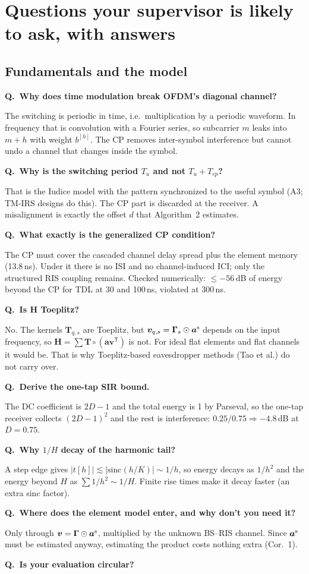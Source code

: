 \documentclass[11pt,a4paper]{article}
\newcounter{qn}
\newcommand{\Q}[1]{\stepcounter{qn}\par\medskip\noindent\textbf{Q\theqn.\ #1}\par\nopagebreak\noindent}
\newcommand{\T}{\mathsf T}
\begin{document}
\section{Questions your supervisor is likely to ask, with answers}

\subsection{Fundamentals and the model}
\Q{Why does time modulation break OFDM's diagonal channel?}
The switching is periodic in time, i.e.\ multiplication by a periodic waveform. In frequency that is convolution with a
Fourier series, so subcarrier $m$ leaks into $m+h$ with weight $b^{[h]}$. The CP removes inter-symbol interference but
cannot undo a channel that changes inside the symbol.
\Q{Why is the switching period $T_u$ and not $T_u+T_{cp}$?}
That is the Iudice model with the pattern synchronized to the useful symbol (A3; TM-IRS designs do this). The CP part is
discarded at the receiver. A misalignment is exactly the offset $d$ that Algorithm~2 estimates.
\Q{What exactly is the generalized CP condition?}
The CP must cover the cascaded channel delay spread plus the element memory (13.8\,ns). Under it there is no ISI and no
channel-induced ICI; only the structured RIS coupling remains. Checked numerically: $\le-56$\,dB of energy beyond the CP for
TDL at 30 and 100\,ns, violated at 300\,ns.
\Q{Is $\bm H$ Toeplitz?}
No. The kernels $\bm T_{q,s}$ are Toeplitz, but $\bm v_{q,s}=\bm\Gamma_s\odot\bm a^{\rm s}$ depends on the input frequency,
so $\bm H=\sum\bm T\circ(\bm a\bm v^{\T})$ is not. For ideal flat elements and flat channels it would be. That is why
Toeplitz-based eavesdropper methods (Tao et al.) do not carry over.
\Q{Derive the one-tap SIR bound.}
The DC coefficient is $2D-1$ and the total energy is 1 by Parseval, so the one-tap receiver collects $(2D-1)^2$ and the rest
is interference: $0.25/0.75\Rightarrow-4.8$\,dB at $D=0.75$.
\Q{Why $1/H$ decay of the harmonic tail?}
A step edge gives $|t[h]|\lesssim|\mathrm{sinc}(h/K)|\sim1/h$, so energy decays as $1/h^2$ and the energy beyond $H$ as
$\sum1/h^2\sim1/H$. Finite rise times make it decay faster (an extra sinc factor).
\Q{Where does the element model enter, and why don't you need it?}
Only through $\bm v=\bm\Gamma\odot\bm a^{\rm s}$, multiplied by the unknown BS--RIS channel. Since $\bm a^{\rm s}$ must be
estimated anyway, estimating the product costs nothing extra (Cor.~1).
\Q{Is your evaluation circular?}
\end{document}
